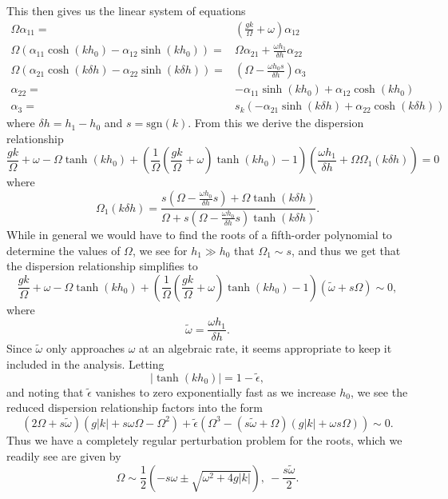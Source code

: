 \documentclass[a4paper,11pt]{article}
\begin{document}
This then gives us the linear system of equations 
\begin{align*}
\Omega \alpha_{11} = & \left(\frac{gk}{\Omega} + \omega \right)\alpha_{12} \\
\Omega\left(\alpha_{11}\cosh(kh_{0}) -\alpha_{12}\sinh(kh_{0}) \right) = &  \Omega \alpha_{21} + \frac{\omega h_{1}}{\delta h}\alpha_{22}\\
\Omega\left(\alpha_{21}\cosh(k\delta h) - \alpha_{22}\sinh(k \delta h) \right) = & \left(\Omega - \frac{\omega h_{0} s}{\delta h} \right)\alpha_{3}\\
\alpha_{22} = & -\alpha_{11}\sinh(kh_{0}) + \alpha_{12}\cosh(kh_{0})  \\
\alpha_{3} = & s_{k}\left(-\alpha_{21}\sinh(k\delta h) + \alpha_{22}\cosh(k\delta h)\right)
\end{align*}
where $\delta h = h_{1}-h_{0}$ and $s=\mbox{sgn}(k)$.  From this we derive the dispersion relationship 
\[
\frac{gk}{\Omega} + \omega -\Omega \tanh(kh_{0}) + \left(\frac{1}{\Omega}\left(\frac{gk}{\Omega} + \omega\right)\tanh(kh_{0}) - 1\right)\left(\frac{\omega h_{1}}{\delta h} + \Omega \Omega_{1}(k\delta h)\right) = 0
\]
where
\[
\Omega_{1}(k\delta h) = \frac{s\left(\Omega -\frac{\omega h_{0}}{\delta h}s\right)+\Omega \tanh(k\delta h)}{\Omega +s\left(\Omega - \frac{\omega h_{0}}{\delta h}s\right)\tanh(k\delta h)}.
\]
While in general we would have to find the roots of a fifth-order polynomial to determine the values of $\Omega$, we see for $h_{1}\gg h_{0}$ that $\Omega_{1}\sim s$, and thus we get that the dispersion relationship simplifies to 
\[
\frac{gk}{\Omega} + \omega -\Omega \tanh(kh_{0}) + \left(\frac{1}{\Omega}\left(\frac{gk}{\Omega} + \omega\right)\tanh(kh_{0}) - 1\right)\left(\tilde{\omega} + s\Omega \right) \sim 0,
\]
where 
\[
\tilde{\omega} = \frac{\omega h_{1}}{\delta h}.
\]
Since $\tilde{\omega}$ only approaches $\omega$ at an algebraic rate, it seems appropriate to keep it included in the analysis.  Letting 
\[
\left|\tanh(kh_{0}) \right| = 1 - \tilde{\epsilon}, 
\]
and noting that $\tilde{\epsilon}$ vanishes to zero exponentially fast as we increase $h_{0}$, we see the reduced dispersion relationship factors into the form
\[
\left(2\Omega + s\tilde{\omega} \right)\left(g\left|k\right| + s\omega \Omega - \Omega^{2} \right) + \tilde{\epsilon}\left(\Omega^{3} - (s\tilde{\omega} + \Omega)(g|k|+\omega s\Omega) \right) \sim 0.
\]
Thus we have a completely regular perturbation problem for the roots, which we readily see are given by
\[
\Omega \sim \frac{1}{2}\left(-s\omega \pm \sqrt{\omega^{2}+4g|k|} \right), ~ -\frac{s\tilde{\omega}}{2}.
\]
\end{document}
